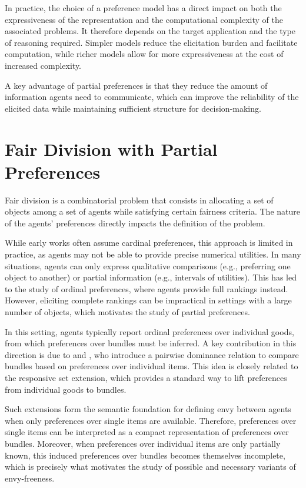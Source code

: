 \documentclass{article}
\begin{document}
In practice, the choice of a preference model has a direct impact on both the expressiveness of the representation and the computational complexity of the associated problems. 
It therefore depends on the target application and the type of reasoning required. 
Simpler models reduce the elicitation burden and facilitate computation, while richer models allow for more expressiveness at the cost of increased complexity.

A key advantage of partial preferences is that they reduce the amount of information agents need to communicate, which can improve the reliability of the elicited data while maintaining sufficient structure for decision-making.

\section{Fair Division with Partial Preferences}

Fair division is a combinatorial problem that consists in allocating a set of objects among a set of agents while satisfying certain fairness criteria. 
The nature of the agents' preferences directly impacts the definition of the problem.

While early works often assume cardinal preferences, this approach is limited in practice, as agents may not be able to provide precise numerical utilities. 
In many situations, agents can only express qualitative comparisons (e.g., preferring one object to another) or partial information (e.g., intervals of utilities).
This has led to the study of ordinal preferences, where agents provide full rankings instead. 
However, eliciting complete rankings can be impractical in settings with a large number of objects, which motivates the study of partial preferences.

In this setting, agents typically report ordinal preferences over individual goods, from which preferences over bundles must be inferred. 
A key contribution in this direction is due to \cite{brams2005efficient} and \cite{brams2003fair}, who introduce a pairwise dominance relation to compare bundles based on preferences over individual items. 
This idea is closely related to the responsive set extension, which provides a standard way to lift preferences from individual goods to bundles. 

Such extensions form the semantic foundation for defining envy between agents when only preferences over single items are available. 
Therefore, preferences over single items can be interpreted as a compact representation of preferences over bundles.
Moreover, when preferences over individual items are only partially known, this induced preferences over bundles becomes themselves incomplete, which is precisely what motivates the study of possible and necessary variants of envy-freeness.
\end{document}
